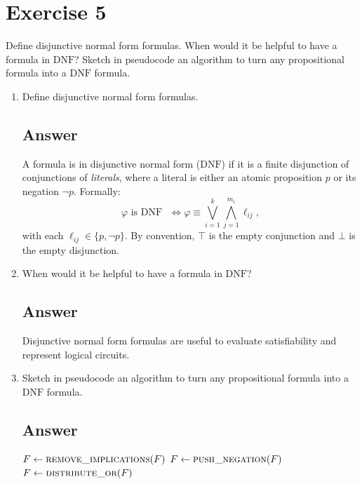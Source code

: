 \documentclass[12pt]{article}
\newcommand{\td}{\text{DNF}}
\begin{document}
	
	\section*{Exercise 5}
	
	\noindent Define disjunctive normal form formulas. When would it be helpful to have a formula in $\td$? Sketch in pseudocode an algorithm to turn any propositional formula into a $\td$ formula.
	
	\bigskip
	
	\begin{enumerate}[start=1,label={\bfseries Part \arabic*:},leftmargin=0in]
		\bigskip\item Define disjunctive normal form formulas.
		
		\subsection*{Answer}
			
			A formula is in disjunctive normal form ($\td$) if it is a finite disjunction of conjunctions of \emph{literals}, where a literal is either an atomic proposition $p$ or its negation $\lnot p$. Formally:
			\[
			\varphi \text{ is $\td$ } \iff \varphi \equiv \bigvee_{i=1}^k \bigwedge_{j=1}^{m_i} \ell_{ij},
			\]
			with each $\ell_{ij}\in\{p,\lnot p\}$. By convention, $\top$ is the empty conjunction and $\bot$ is the empty disjunction.
			
		\bigskip\item When would it be helpful to have a formula in $\td$?
		
		\subsection*{Answer}
			
			Disjunctive normal form formulas are useful to evaluate satisfiability and represent logical circuits.
			
		\bigskip\item Sketch in pseudocode an algorithm to turn any propositional formula into a $\td$ formula.
			
		\subsection*{Answer}
			
			\begin{algorithm}
				
				\caption{\td(F)}
				
				\begin{algorithmic}
					
					\State $F \gets \Call{remove\_implications}{F}$ 
					\State $F \gets \Call{push\_negation}{F}$ 
					\State $F \gets \Call{distribute\_or}{F}$ 
					\State \Return {}
					
				\end{algorithmic}
				
			\end{algorithm}
			
	\end{enumerate}
	
\end{document}

